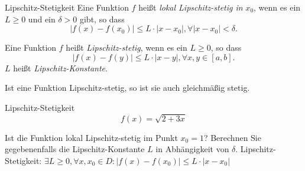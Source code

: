 \documentclass[german]{../spicker}
\renewcommand{\abs}[1]{\left| #1 \right|}
\begin{document}
\begin{defi}{Lipschitz-Stetigkeit}
    Eine Funktion $f$ heißt \emph{lokal Lipschitz-stetig in} $x_0$, wenn es ein $L \geq 0$ und ein $\delta > 0$ gibt, so dass
    $$
        \abs{f(x) - f(x_0)} \leq L \cdot \abs{x-x_0}, \forall \abs{x-x_0} < \delta.
    $$

    Eine Funktion $f$ heißt \emph{Lipschitz-stetig}, wenn es ein $L \geq 0$, so dass
    $$
        \abs{f(x) - f(y)} \leq L \cdot \abs{x-y}, \forall x, y \in [a, b].
    $$
    $L$ heißt \emph{Lipschitz-Konstante}.

    Ist eine Funktion Lipschitz-stetig, so ist sie auch gleichmäßig stetig.
\end{defi}

\begin{example}{Lipschitz-Stetigkeit}\
    $$f(x) = \sqrt{2+3x}$$

    Ist die Funktion lokal Lipschitz-stetig im Punkt $x_0 = 1$?
    Berechnen Sie gegebenenfalls die Lipschitz-Konstante $L$ in Abhängigkeit von $\delta$.
    Lipschitz-Stetigkeit: $\exists L \geq 0, \forall x,x_0\in D: \abs{f(x)-f(x_0)} \leq L \cdot \abs{x-x_0}$


\end{example}
\end{document}
